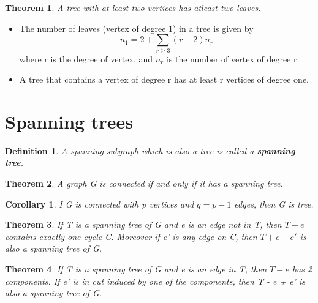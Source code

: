 \documentclass[10pt, a4paper]{article}
\newtheorem*{thm}{Theorem}
\newtheorem*{defn}{Definition}
\newtheorem*{corol}{Corollary}
\begin{document}
\begin{thm}
    A tree with at least two vertices has atleast two leaves.
\end{thm}

\begin{term}
    \begin{itemize}
        \item The number of leaves (vertex of degree 1) in a tree is given by 
            \[n_1 = 2 + \sum_{r\ge 3} (r-2)n_r\]
            where r is the degree of vertex, and $n_r$ is the number of vertex of degree r.
        \item A tree that contains a vertex of degree r has at least r vertices of degree one.
    \end{itemize}
\end{term}
\section{Spanning trees}
\begin{defn}
    A spanning subgraph which is also a tree is called a \textbf{spanning tree}.
\end{defn}
\begin{thm}
    A graph G is connected if and only if it has a spanning tree.
\end{thm}
\begin{corol}
    I G is connected with p vertices and $q = p-1$ edges, then G is tree.
\end{corol}

\begin{thm}
    If T is a spanning tree of G and e is an edge not in T, then  $T + e$ contains exactly one cycle C. Moreover if e' is any edge on C, then $T + e - e'$ is also a spanning tree of G. 
\end{thm}

\begin{thm}
    If T is a spanning tree of G and e is an  edge in T, then $T - e$ has 2 components. If e' is in cut induced by one of the components, then T - e + e' is also a spanning tree of G.
\end{thm}
\end{document}
